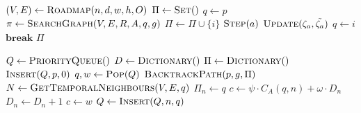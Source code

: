 \begin{algorithm}[ht]
    \caption{$\Function{GetPath}(n, d, w, h, \delta, p, g, O, A, R)$}
    \\\algorithmicensure{}
    \label{algo:path}
    \begin{algorithmic}[1]
        \setcounter{ALC@line}{0}
        \STATE $(V, E) \leftarrow \Function{Roadmap}(n, d, w, h, O)$
        \STATE $\Pi \leftarrow \Function{Set}()$
        \STATE $q \leftarrow p$
            \STATE $\pi \leftarrow \Function{SearchGraph}(V, E, R, A, q, g)$
                \STATE $\Pi \leftarrow \Pi \cup \{i\}$
                    \STATE $\Function{Step}(a)$
                \ENDFOR
                        \STATE $\Function{Update}(\zeta_a, \tilde{\zeta_a})$
                    \ENDFOR
                    \STATE $q \leftarrow i$
                    \STATE $\textbf{break}$
                \ENDIF
            \ENDFOR
        \ENDWHILE
        \RETURN $\Pi$
    \end{algorithmic}
\end{algorithm}

\begin{algorithm}[ht]
    \caption{$\Function{SearchGraph}(V, E, R, A, p, g)$}
    \label{algo:search}
    \begin{algorithmic}[1]
        \setcounter{ALC@line}{0}
        \vspace*{1mm}
        \STATE $Q \leftarrow \Function{PriorityQueue}()$
        \STATE $D \leftarrow \Function{Dictionary}()$
        \STATE $\Pi \leftarrow \Function{Dictionary}()$
        \STATE $\Function{Insert}(Q, p, 0)$
            \STATE $q, w \leftarrow \Function{Pop}(Q)$
                \RETURN $\Function{BacktrackPath}(p, g, \Pi)$
            \ENDIF
            \STATE $N \leftarrow \Function{GetTemporalNeighbours}(V, E, q)$
                \STATE $\Pi_n \leftarrow q$
                \STATE $c \leftarrow \psi \cdot C_A(q, n) + \omega \cdot D_n$
                \STATE $D_n \leftarrow D_n + 1$
                    \STATE $c \leftarrow w$
                \ENDIF
                \STATE $Q \leftarrow \Function{Insert}(Q, n, q)$
            \ENDFOR
        \ENDWHILE
    \end{algorithmic}
\end{algorithm}

